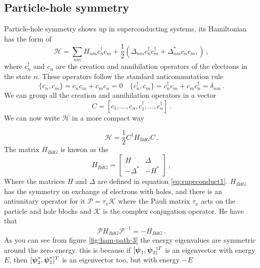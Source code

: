 \subsection*{Particle-hole symmetry}
    Particle-hole symmetry shows up in superconducting systems, its Hamiltonian has the form of 
    \begin{equation}
        \mathcal H = \sum_{nm}H_{nm}c^\dag_nc_m+\frac 12
        \left(
             \Delta_{nm}c_n^\dag c_m^\dag+\Delta^*_{nm}c_n c_m,
        \right)\,,
        \label{eq:supeconduct1}
    \end{equation}
    where $c_n^\dag$ and $c_n$ are the creation and annihilation operators of the electrons in the state $n$. These operators follow the standard anticommutation rule
    \begin{equation}
        \{c_n,c_m\}=c_nc_m+c_mc_n=0
        \quad
        \{c_n^\dag,c_m\}=c_n^\dag c_m+c_mc_n^\dag=\delta_{nm}\,.
    \end{equation}
    We can group all the creation and annihilation operators in a vector \[C=[c_1,\dots,c_n,c_1^\dag,\dots,c_n^\dag]\,.\]
    We can now write $\mathcal H$ in a more compact way
    
    \begin{equation}
        \mathcal H=\frac 12 C^\dag H_{BdG}C\,.
    \end{equation}
    The matrix $H_{BdG}$ is knwon as the 
    \begin{equation}
        H_{BdG}=
        \begin{bmatrix}
        H&\Delta\\
        -\Delta^*&-H^*
        \end{bmatrix}\,,
    \end{equation}
    Where the matrices $H$ and $\Delta$ are defined in equation \ref{eq:supeconduct1}. $H_{BdG}$ has the symmetry on exchange of electrons with holes, and there is an antiunitary operator for it $\mathcal P=\tau_x\mathcal K$ where the Pauli matrix $\tau_x$ acts on the particle and hole blocks and $\mathcal K$ is the complex conjugation operator. He have that
    \begin{equation}
        \mathcal P H_{BdG}\mathcal P^{-1}=-H_{BdG}\,.
    \end{equation}
    As you can see from figure \ref{fig:ham-path-3} the energy eigenvalues are symmetric around the zero energy. this is because if $[\boldsymbol{\psi}_1,\boldsymbol{\psi}_2]^T$ is an eigenvector with energy $E$, then $[\boldsymbol{\psi}_2^*,\boldsymbol{\psi}_1^*]^T$ is an eigenvector too, but with energy $-E$
    
